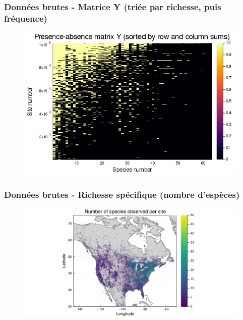 \documentclass[10pt]{beamer}
\begin{document}
\begin{frame}
  \frametitle{Données brutes - Matrice Y (triée par richesse, puis fréquence)}
  \begin{figure}
    \centering
    \includegraphics[scale=0.4]{../fig/raw/raw-Y-rowcolsorted.png}
  \end{figure}
\end{frame}

\begin{frame}
  \frametitle{Données brutes - Richesse spécifique (nombre d'espèces)}
  \begin{figure}
    \centering
    \hspace*{-2cm}\includegraphics[scale=0.5]{../fig/raw/raw-richness.pdf}
  \end{figure}
\end{frame}
\end{document}
